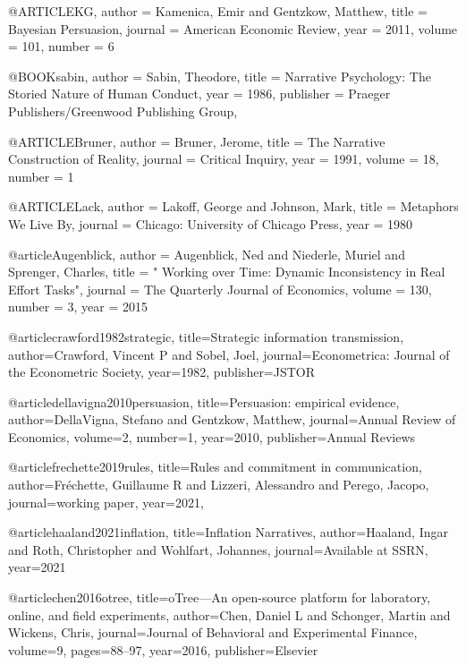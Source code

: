 @ARTICLE{KG,
author =       {Kamenica, Emir  and Gentzkow, Matthew},
title =        {Bayesian Persuasion},
journal =      {American Economic Review},
year =         {2011},
volume =       {101},
number =       {6}
}


@BOOK{sabin,
author =       {Sabin, Theodore},
title =        {Narrative Psychology: The Storied Nature of Human Conduct},
year =         {1986},
publisher =    {Praeger Publishers/Greenwood Publishing Group},
}


@ARTICLE{Bruner,
author =       {Bruner, Jerome},
title =        {The Narrative Construction of Reality},
journal =      {Critical Inquiry},
year =         {1991},
volume =       {18},
number =       {1}
}

@ARTICLE{Lack,
author =       {Lakoff, George and Johnson, Mark},
title =        {Metaphors We Live By},
journal =      {Chicago: University of Chicago
Press},
year =         {1980}
}

@article{Augenblick,
  author = {Augenblick, Ned and Niederle, Muriel and Sprenger, Charles},
  title = "{ Working over Time: Dynamic Inconsistency in Real Effort Tasks}",
  journal = {The Quarterly Journal of Economics},
  volume = {130},
  number = {3},
  year = {2015}
}

@article{crawford1982strategic,
title={Strategic information transmission},
author={Crawford, Vincent P and Sobel, Joel},
journal={Econometrica: Journal of the Econometric Society},
year={1982},
publisher={JSTOR}
}


@article{dellavigna2010persuasion,
title={Persuasion: empirical evidence},
author={DellaVigna, Stefano and Gentzkow, Matthew},
journal={Annual Review of Economics},
volume={2},
number={1},
year={2010},
publisher={Annual Reviews}
}

@article{frechette2019rules,
title={Rules and commitment in communication},
author={Fr{\'e}chette, Guillaume R and Lizzeri, Alessandro and Perego, Jacopo},
journal={working paper},
year={2021},
}

@article{haaland2021inflation,
title={Inflation Narratives},
author={Haaland, Ingar and Roth, Christopher and Wohlfart, Johannes},
journal={Available at SSRN},
year={2021}
}

@article{chen2016otree,
  title={oTree—An open-source platform for laboratory, online, and field experiments},
  author={Chen, Daniel L and Schonger, Martin and Wickens, Chris},
  journal={Journal of Behavioral and Experimental Finance},
  volume={9},
  pages={88--97},
  year={2016},
  publisher={Elsevier}
}

